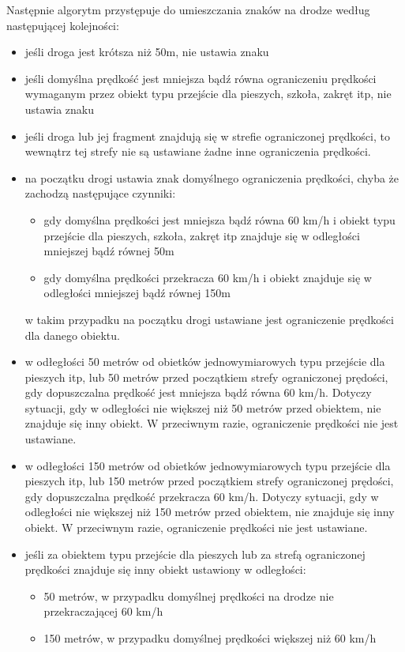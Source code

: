 Następnie algorytm przystępuje do umieszczania znaków na drodze według następującej kolejności:
\begin{itemize}
\item jeśli droga jest krótsza niż 50m, nie ustawia znaku
\item jeśli domyślna prędkość jest mniejsza bądź równa ograniczeniu prędkości wymaganym przez obiekt typu przejście dla pieszych, szkoła, zakręt itp, nie ustawia znaku
\item jeśli droga lub jej fragment znajdują się w strefie ograniczonej prędkości, to wewnątrz tej strefy nie są ustawiane żadne inne ograniczenia prędkości.
\item na początku drogi ustawia znak domyślnego ograniczenia prędkości, chyba że zachodzą następujące czynniki:
\begin{itemize}
\item gdy domyślna prędkości jest mniejsza bądź równa 60 km/h i obiekt typu przejście dla pieszych, szkoła, zakręt itp znajduje się w  odległości mniejszej bądź równej 50m
\item gdy domyślna prędkości przekracza 60 km/h i obiekt znajduje się w  odległości mniejszej bądź równej 150m 
\end{itemize}
w takim przypadku na początku drogi ustawiane jest ograniczenie prędkości dla danego obiektu.
\item w odłegłości 50 metrów od obietków jednowymiarowych typu przejście dla pieszych itp, lub 50 metrów przed początkiem strefy ograniczonej prędości, gdy dopuszczalna prędkość jest mniejsza bądź równa 60 km/h. Dotyczy sytuacji, gdy w odległości nie większej niż 50 metrów przed obiektem, nie znajduje się inny obiekt. W przeciwnym razie, ograniczenie prędkości nie jest ustawiane.
\item w odłegłości 150 metrów od obietków jednowymiarowych typu przejście dla pieszych itp, lub 150 metrów przed początkiem strefy ograniczonej prędości, gdy dopuszczalna prędkość przekracza 60 km/h. Dotyczy sytuacji, gdy w odległości nie większej niż 150 metrów przed obiektem, nie znajduje się inny obiekt. W przeciwnym razie, ograniczenie prędkości nie jest ustawiane.
\item jeśli za obiektem typu przejście dla pieszych lub za strefą ograniczonej prędkości znajduje się inny obiekt ustawiony w odległości:
\begin{itemize}
\item 50 metrów, w przypadku domyślnej prędkości na drodze nie przekraczającej 60 km/h
\item 150 metrów, w przypadku domyślnej prędkości większej niż 60 km/h

\end{itemize}
\end{itemize}
